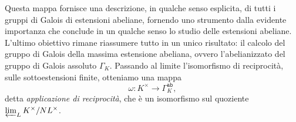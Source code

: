 Questa mappa fornisce una descrizione, in qualche senso esplicita, di tutti i gruppi di Galois di estensioni abeliane, fornendo uno strumento dalla evidente importanza che conclude in un qualche senso lo studio delle estensioni abeliane. L'ultimo obiettivo rimane riassumere tutto in un unico risultato: il calcolo del gruppo di Galois della massima estensione abeliana, ovvero l'abelianizzato del gruppo di Galois assoluto $ \Gamma_K $. Passando al limite l'isomorfismo di reciprocità, sulle sottoestensioni finite, otteniamo una mappa
\[ \omega\colon K^\times \to \Gamma_K^{\texttt{ab}}, \]
detta \emph{applicazione di reciprocità}, che è un isomorfismo sul quoziente $ \varprojlim_L K^\times/NL^\times $.

